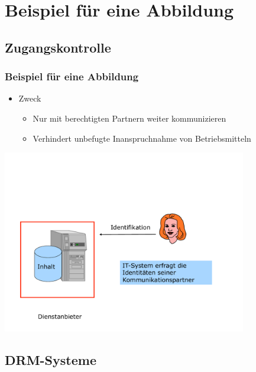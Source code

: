 \section{Beispiel für eine Abbildung} %

\subsection{Zugangskontrolle} %
\begin{frame}
	\frametitle{Beispiel für eine Abbildung}
	\begin{itemize}
		\item Zweck
			\begin{itemize}
				\item Nur mit \alert{berechtigten Partnern} weiter kommunizieren
				\item Verhindert unbefugte Inanspruchnahme von Betriebsmitteln
			\end{itemize}
	\end{itemize}
	\vspace{\fill}
	\pause %
	\begin{center}
		\includegraphics[width=0.8\textwidth]{pic/abbildung1.pdf}
	\end{center}
\end{frame}

\subsection{DRM-Systeme} %


